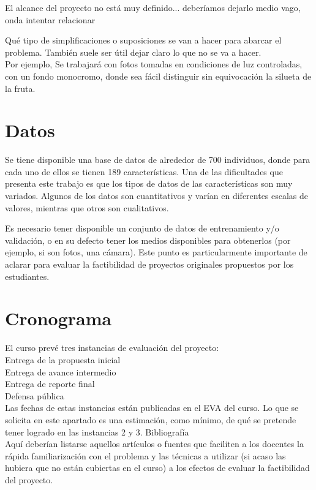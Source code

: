 \documentclass[12pt,a4paper,titlepage]{report}
\begin{document}
El alcance del proyecto no está muy definido... deberíamos dejarlo medio vago, onda intentar relacionar 

Qué tipo de simplificaciones o suposiciones se van a hacer para abarcar el problema. También suele ser útil dejar claro lo que no se va a hacer.\\
Por ejemplo, Se trabajará con fotos tomadas en condiciones de luz controladas, con un fondo monocromo, donde sea fácil distinguir sin equivocación la silueta de la fruta.

\section*{Datos}

Se tiene disponible una base de datos de alrededor de 700 individuos, donde para cada uno de ellos se tienen 189 características. Una de las dificultades que presenta este trabajo es que los tipos de datos de las características son muy variados. Algunos de los datos son cuantitativos y varían en diferentes escalas de valores, mientras que otros son cualitativos. 

Es necesario tener disponible un conjunto de datos de entrenamiento y/o validación, o en su defecto tener los medios disponibles para obtenerlos (por ejemplo, si son fotos, una cámara). Este punto es particularmente importante de aclarar para evaluar la factibilidad de proyectos originales propuestos por los estudiantes.

\section*{Cronograma}

El curso prevé tres instancias de evaluación del proyecto:\\

    Entrega de la propuesta inicial\\
    Entrega de avance intermedio\\
    Entrega de reporte final\\
    Defensa pública\\

Las fechas de estas instancias están publicadas en el EVA del curso. Lo que se solicita en este apartado es una estimación, como mínimo, de qué se pretende tener logrado en las instancias 2 y 3.
Bibliografía\\

Aquí deberían listarse aquellos artículos o fuentes que faciliten a los docentes la rápida familiarización con el problema y las técnicas a utilizar (si acaso las hubiera que no están cubiertas en el curso) a los efectos de evaluar la factibilidad del proyecto. \\
\end{document}
